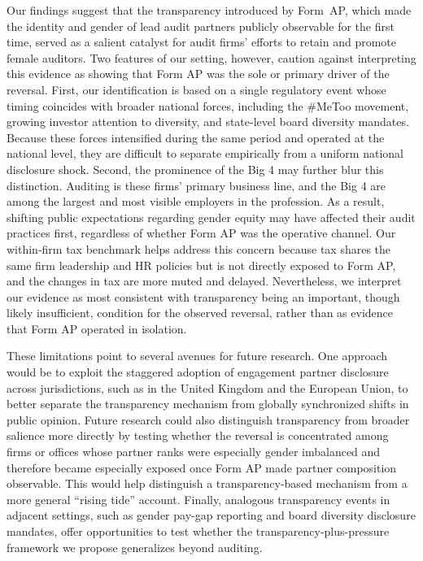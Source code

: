 \documentclass[11pt]{article}
\begin{document}
    Our findings suggest that the transparency introduced by Form~AP, which made the identity and gender of lead audit partners publicly observable for the first time, served as a salient catalyst for audit firms' efforts to retain and promote female auditors. Two features of our setting, however, caution against interpreting this evidence as showing that Form AP was the sole or primary driver of the reversal. First, our identification is based on a single regulatory event whose timing coincides with broader national forces, including the \#MeToo movement, growing investor attention to diversity, and state-level board diversity mandates. Because these forces intensified during the same period and operated at the national level, they are difficult to separate empirically from a uniform national disclosure shock. Second, the prominence of the Big 4 may further blur this distinction. Auditing is these firms' primary business line, and the Big 4 are among the largest and most visible employers in the profession. As a result, shifting public expectations regarding gender equity may have affected their audit practices first, regardless of whether Form AP was the operative channel. Our within-firm tax benchmark helps address this concern because tax shares the same firm leadership and HR policies but is not directly exposed to Form AP, and the changes in tax are more muted and delayed. Nevertheless, we interpret our evidence as most consistent with transparency being an important, though likely insufficient, condition for the observed reversal, rather than as evidence that Form AP operated in isolation.
    
    These limitations point to several avenues for future research. One approach would be to exploit the staggered adoption of engagement partner disclosure across jurisdictions, such as in the United Kingdom and the European Union, to better separate the transparency mechanism from globally synchronized shifts in public opinion. Future research could also distinguish transparency from broader salience more directly by testing whether the reversal is concentrated among firms or offices whose partner ranks were especially gender imbalanced and therefore became especially exposed once Form AP made partner composition observable. This would help distinguish a transparency-based mechanism from a more general ``rising tide'' account. Finally, analogous transparency events in adjacent settings, such as gender pay-gap reporting and board diversity disclosure mandates, offer opportunities to test whether the transparency-plus-pressure framework we propose generalizes beyond auditing.
\end{document}
